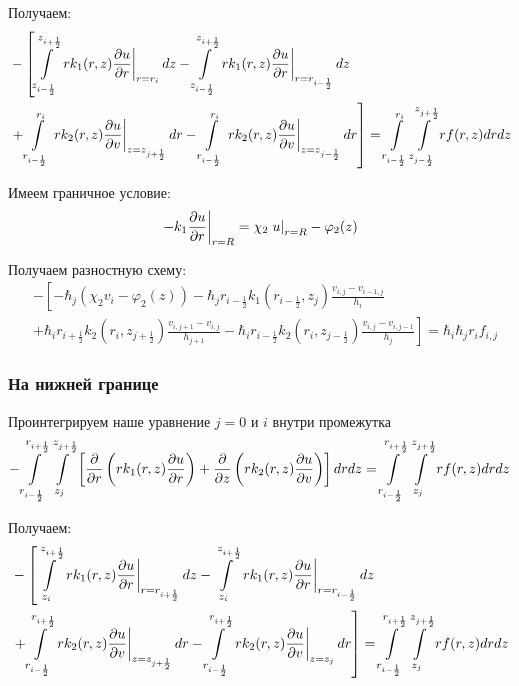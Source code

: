 Получаем:
\begin{align*}
  &- \left [
   \int\limits^{z_{i+\frac{1}{2}}}_{z_{i-\frac{1}{2}}}  \left . r k_1(r, z) \pdv{u}{r} \right \vert_{r = r_{i}} dz
  - \int\limits^{z_{i+\frac{1}{2}}}_{z_{i-\frac{1}{2}}} \left . r k_1(r, z) \pdv{u}{r} \right \vert_{r = r_{i - \frac{1}{2}}} dz
  \right . \\
  &\left . + \int\limits^{r_{i}}_{r_{i-\frac{1}{2}}} \left . rk_2(r, z)\pdv{u}{v} \right \vert_{z = z_{j + \frac{1}{2}}} dr
  - \int\limits^{r_{i}}_{r_{i-\frac{1}{2}}} \left . rk_2(r, z)\pdv{u}{v} \right \vert_{z = z_{j - \frac{1}{2}}} dr
  \right ] = \int\limits^{r_{i }}_{r_{i -\frac{1}{2}}} \int\limits^{z_{j +\frac{1}{2}}}_{z_{j -\frac{1}{2}}} rf(r, z) dr dz
\end{align*}

Имеем граничное условие:
\[
  \left . -k_1 \pdv{u}{r} \right \vert_{r=R} = \chi_2 \left . u \right \vert_{r=R} - \varphi_2(z)
\]

Получаем разностную схему:
\begin{align*}
  &- \left [ 
  -\hbar_j ( \chi_2 v_i - \varphi_2(z))
  - \hbar_j r_{i-\frac{1}{2}} k_1(r_{i-\frac{1}{2}}, z_j) \frac{v_{i, j} - v_{i - 1, j}}{h_{i}}
  \right . \\
  &\left .
  + \hbar_i r_{i+\frac{1}{2}} k_2(r_i, z_{j+\frac{1}{2}}) \frac{v_{i, j + 1} - v_{i, j}}{h_{j + 1}}
  - \hbar_i r_{i-\frac{1}{2}} k_2(r_i, z_{j-\frac{1}{2}}) \frac{v_{i, j} - v_{i, j - 1}}{h_j}
  \right ]  = \hbar_i \hbar_j r_i f_{i, j}
\end{align*}

\subsubsection{На нижней границе}
Проинтегрируем наше уравнение $ j = 0 $ и $ i $ внутри промежутка
\[
  - \int\limits^{r_{i +\frac{1}{2}}}_{r_{i -\frac{1}{2}}} \int\limits^{z_{j +\frac{1}{2}}}_{z_{j }} \left [ \pdv{}{r} \left ( r k_1(r, z) \pdv{u}{r} \right ) 
  + \pdv{}{z} \left ( rk_2(r, z)\pdv{u}{v} \right ) \right ] drdz = \int\limits^{r_{i +\frac{1}{2}}}_{r_{i -\frac{1}{2}}} \int\limits^{z_{j +\frac{1}{2}}}_{z_{j }} rf(r, z) dr dz
\]

Получаем:
\begin{align*}
  &- \left [
   \int\limits^{z_{i+\frac{1}{2}}}_{z_{i}}  \left . r k_1(r, z) \pdv{u}{r} \right \vert_{r = r_{i + \frac{1}{2}}} dz
  - \int\limits^{z_{i+\frac{1}{2}}}_{z_{i}} \left . r k_1(r, z) \pdv{u}{r} \right \vert_{r = r_{i - \frac{1}{2}}} dz
  \right . \\
  &\left . + \int\limits^{r_{i+\frac{1}{2}}}_{r_{i-\frac{1}{2}}} \left . rk_2(r, z)\pdv{u}{v} \right \vert_{z = z_{j + \frac{1}{2}}} dr
  - \int\limits^{r_{i+\frac{1}{2}}}_{r_{i-\frac{1}{2}}} \left . rk_2(r, z)\pdv{u}{v} \right \vert_{z = z_{j}} dr
  \right ] = \int\limits^{r_{i +\frac{1}{2}}}_{r_{i -\frac{1}{2}}} \int\limits^{z_{j +\frac{1}{2}}}_{z_{j }} rf(r, z) dr dz
\end{align*}

